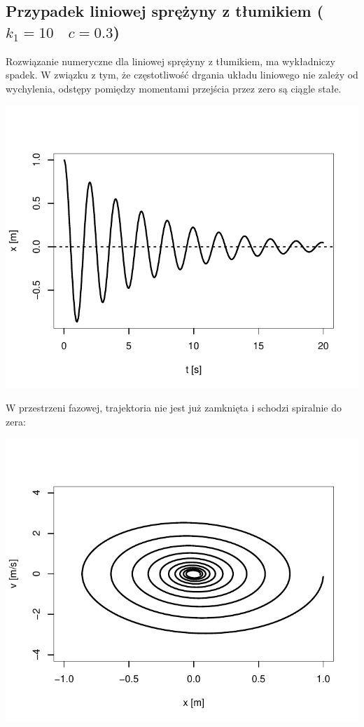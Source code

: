 \documentclass[12pt]{sprawozdanie}
\begin{document}
\hypertarget{przypadek-liniowej-sprezyny-z-tumikiem-k_110quad-c0.3}{%
\subsection{\texorpdfstring{Przypadek liniowej sprężyny z tłumikiem
(\(k_1=10\quad c=0.3\))}{Przypadek liniowej sprężyny z tłumikiem (k\_1=10\textbackslash{}quad c=0.3)}}\label{przypadek-liniowej-sprezyny-z-tumikiem-k_110quad-c0.3}}

Rozwiązanie numeryczne dla liniowej sprężyny z tłumikiem, ma wykładniczy
spadek. W związku z tym, że częstotliwość drgania układu liniowego nie
zależy od wychylenia, odstępy pomiędzy momentami przejścia przez zero są
ciągle stałe.

\begin{center}\includegraphics{info2_files/figure-latex/linear-dump-solution-1} \end{center}

W przestrzeni fazowej, trajektoria nie jest już zamknięta i schodzi
spiralnie do zera:

\begin{center}\includegraphics{info2_files/figure-latex/linear-dump-phase-1} \end{center}
\end{document}
